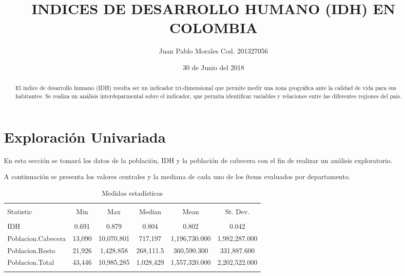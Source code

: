 \documentclass{article}
\title{INDICES DE DESARROLLO HUMANO (IDH) EN COLOMBIA}
\author[1]{\normalsize Juan Pablo Morales Cod. 201327056}
\date{30 de Junio del 2018}
\begin{document}


\maketitle

\begin{abstract}
El índice de desarrollo humano (IDH) resulta ser un indicador tri-dimensional que permite medir una zona geográfica ante la calidad de vida para sus habitantes. Se realiza un análisis interdeparmental sobre el indicador, que permita identificar variables y relaciones entre las diferentes regiones del país.
\end{abstract}

\section{Exploración Univariada}\label{univariada}

En esta sección se tomará los datos de la población, IDH y la población de cabecera con el fin de realizar un análisis exploratorio.


A continuación se presenta los valores centrales y la mediana de cada uno de los ítems evaluados por departamento.

\begin{table}[!htbp] \centering 
  \caption{Medidas estadísticas} 
  \label{stats} 
\begin{tabular}{@{\extracolsep{5pt}}lccccc} 
\\[-1.8ex]\hline 
\hline \\[-1.8ex] 
Statistic & \multicolumn{1}{c}{Min} & \multicolumn{1}{c}{Max} & \multicolumn{1}{c}{Median} & \multicolumn{1}{c}{Mean} & \multicolumn{1}{c}{St. Dev.} \\ 
\hline \\[-1.8ex] 
IDH & 0.691 & 0.879 & 0.804 & 0.802 & 0.042 \\ 
Poblacion.Cabecera & 13,090 & 10,070,801 & 717,197 & 1,196,730.000 & 1,982,287.000 \\ 
Poblacion.Resto & 21,926 & 1,428,858 & 268,111.5 & 360,590.300 & 331,887.600 \\ 
Poblacion.Total & 43,446 & 10,985,285 & 1,028,429 & 1,557,320.000 & 2,202,522.000 \\ 
\hline \\[-1.8ex] 
\end{tabular} 
\end{table} 
\end{document}
